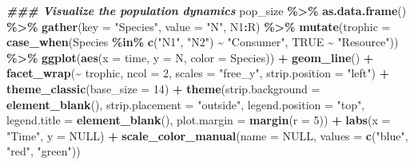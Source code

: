 \documentclass[
]{book}
\newenvironment{Shaded}{\begin{snugshade}}{\end{snugshade}}
\newcommand{\AttributeTok}[1]{\textcolor[rgb]{0.13,0.29,0.53}{#1}}
\newcommand{\ConstantTok}[1]{\textcolor[rgb]{0.56,0.35,0.01}{#1}}
\newcommand{\DecValTok}[1]{\textcolor[rgb]{0.00,0.00,0.81}{#1}}
\newcommand{\DocumentationTok}[1]{\textcolor[rgb]{0.56,0.35,0.01}{\textbf{\textit{#1}}}}
\newcommand{\FunctionTok}[1]{\textcolor[rgb]{0.13,0.29,0.53}{\textbf{#1}}}
\newcommand{\NormalTok}[1]{#1}
\newcommand{\SpecialCharTok}[1]{\textcolor[rgb]{0.81,0.36,0.00}{\textbf{#1}}}
\newcommand{\StringTok}[1]{\textcolor[rgb]{0.31,0.60,0.02}{#1}}
\begin{document}
\begin{Shaded}
\begin{Highlighting}[]
\DocumentationTok{\#\#\# Visualize the population dynamics}
\NormalTok{pop\_size }\SpecialCharTok{\%\textgreater{}\%}
  \FunctionTok{as.data.frame}\NormalTok{() }\SpecialCharTok{\%\textgreater{}\%}
  \FunctionTok{gather}\NormalTok{(}\AttributeTok{key =} \StringTok{"Species"}\NormalTok{, }\AttributeTok{value =} \StringTok{"N"}\NormalTok{, N1}\SpecialCharTok{:}\NormalTok{R) }\SpecialCharTok{\%\textgreater{}\%}
  \FunctionTok{mutate}\NormalTok{(}\AttributeTok{trophic =} \FunctionTok{case\_when}\NormalTok{(Species }\SpecialCharTok{\%in\%} \FunctionTok{c}\NormalTok{(}\StringTok{"N1"}\NormalTok{, }\StringTok{"N2"}\NormalTok{) }\SpecialCharTok{\textasciitilde{}} \StringTok{"Consumer"}\NormalTok{,}
                             \ConstantTok{TRUE} \SpecialCharTok{\textasciitilde{}} \StringTok{"Resource"}\NormalTok{)) }\SpecialCharTok{\%\textgreater{}\%}
  \FunctionTok{ggplot}\NormalTok{(}\FunctionTok{aes}\NormalTok{(}\AttributeTok{x =}\NormalTok{ time, }\AttributeTok{y =}\NormalTok{ N, }\AttributeTok{color =}\NormalTok{ Species)) }\SpecialCharTok{+} 
  \FunctionTok{geom\_line}\NormalTok{() }\SpecialCharTok{+}
  \FunctionTok{facet\_wrap}\NormalTok{(}\SpecialCharTok{\textasciitilde{}}\NormalTok{ trophic, }
             \AttributeTok{ncol =} \DecValTok{2}\NormalTok{, }
             \AttributeTok{scales =} \StringTok{"free\_y"}\NormalTok{,}
             \AttributeTok{strip.position =} \StringTok{"left"}\NormalTok{) }\SpecialCharTok{+}
  \FunctionTok{theme\_classic}\NormalTok{(}\AttributeTok{base\_size =} \DecValTok{14}\NormalTok{) }\SpecialCharTok{+}
  \FunctionTok{theme}\NormalTok{(}\AttributeTok{strip.background =} \FunctionTok{element\_blank}\NormalTok{(),}
        \AttributeTok{strip.placement =} \StringTok{"outside"}\NormalTok{,}
        \AttributeTok{legend.position =} \StringTok{"top"}\NormalTok{,}
        \AttributeTok{legend.title =} \FunctionTok{element\_blank}\NormalTok{(),}
        \AttributeTok{plot.margin =} \FunctionTok{margin}\NormalTok{(}\AttributeTok{r =} \DecValTok{5}\NormalTok{)) }\SpecialCharTok{+} 
  \FunctionTok{labs}\NormalTok{(}\AttributeTok{x =} \StringTok{"Time"}\NormalTok{, }\AttributeTok{y =} \ConstantTok{NULL}\NormalTok{) }\SpecialCharTok{+}
  \FunctionTok{scale\_color\_manual}\NormalTok{(}\AttributeTok{name =} \ConstantTok{NULL}\NormalTok{, }\AttributeTok{values =} \FunctionTok{c}\NormalTok{(}\StringTok{"blue"}\NormalTok{, }\StringTok{"red"}\NormalTok{, }\StringTok{"green"}\NormalTok{))}
\end{Highlighting}
\end{Shaded}
\end{document}
